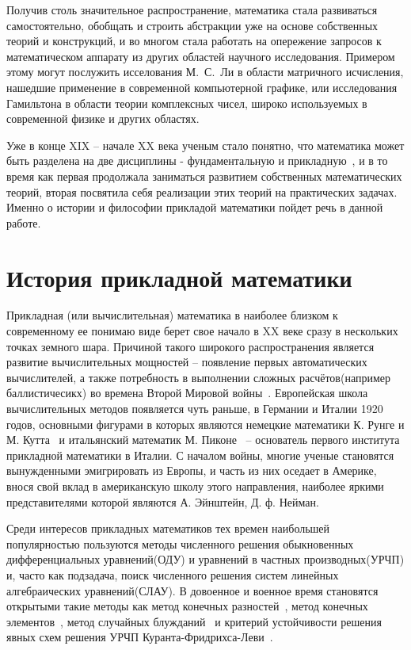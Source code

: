 Получив столь значительное распространение, математика стала развиваться самостоятельно, обобщать и строить абстракции уже на основе собственных теорий и конструкций, и во многом стала работать на опережение запросов к математическом аппарату из других областей научного исследования. Примером этому могут послужить исселования М.~С.~Ли в области матричного исчисления, нашедшие применение в современной компьютерной графике, или исследования Гамильтона в области теории комплексных чисел, широко используемых в современной физике и других областях.


Уже в конце XIX -- начале XX века ученым стало понятно, что математика может быть разделена на две дисциплины - фундаментальную и прикладную~\cite{benzi}, и в то время как первая продолжала заниматься развитием собственных математических теорий, вторая посвятила себя реализации этих теорий на практических задачах. Именно о истории и философии прикладой математики пойдет речь в данной работе.


\section{История прикладной математики}
Прикладная (или вычислительная) математика в наиболее близком к современному ее понимаю виде берет свое начало в XX веке сразу в нескольких точках земного шара. Причиной такого широкого распространения является развитие вычислительных мощностей -- появление первых автоматических вычислителей, а также потребность в выполнении сложных расчётов(например баллистичесикх) во времена Второй Мировой войны~\cite{benzi}. Европейская школа вычислительных методов появляется чуть раньше, в Германии и Италии 1920 годов, основными фигурами в которых являются немецкие математики К. Рунге и М. Кутта~\cite{w:runge} и итальянский математик М. Пиконе~\cite{w:picone} -- основатель первого института прикладной математики в Италии. С началом войны, многие ученые становятся вынужденными эмигрировать из Европы, и часть из них оседает в Америке, внося свой вклад в американскую школу этого направления, наиболее яркими представителями которой являются А. Эйнштейн, Д. ф. Нейман.


Среди интересов прикладных математиков тех времен наибольшей популярностью пользуются методы численного решения обыкновенных дифференциальных уравнений(ОДУ) и уравнений в частных производных(УРЧП) и, часто как подзадача, поиск численного решения систем линейных алгебраических уравнений(СЛАУ). В довоенное и военное время становятся открытыми такие методы как метод конечных разностей~\cite{finite_dif_pde}, метод конечных элементов~\cite{cfe_pde}, метод случайных блужданий~\cite{w:random_walk} и критерий устойчивости решения явных схем решения УРЧП Куранта-Фридрихса-Леви~\cite{cfl_pde}.


